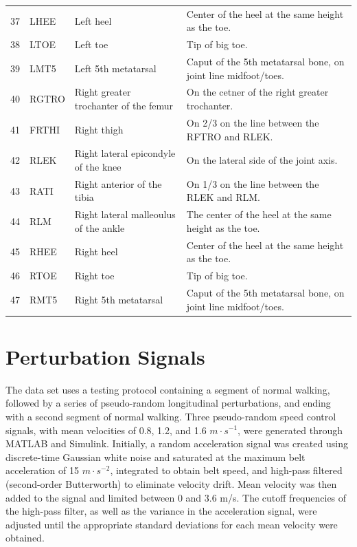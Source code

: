 \documentclass[10pt,a4paper,twocolumn]{article}
\begin{document}
\begin{table}
\begin{tabular}{rlll}
    37 & LHEE  & Left heel                             & Center of the heel at the same height as the toe. \\
    38 & LTOE  & Left toe                              & Tip of big toe. \\
    39 & LMT5  & Left 5th metatarsal                   & Caput of the 5th metatarsal bone, on joint line midfoot/toes. \\
    40 & RGTRO & Right greater trochanter of the femur & On the cetner of the right greater trochanter. \\
    41 & FRTHI & Right thigh                           & On 2/3 on the line between the RFTRO and RLEK. \\
    42 & RLEK  & Right lateral epicondyle of the knee  & On the lateral side of the joint axis. \\
    43 & RATI  & Right anterior of the tibia           & On 1/3 on the line between the RLEK and RLM. \\
    44 & RLM   & Right lateral malleoulus of the ankle & The center of the heel at the same height as the toe. \\
    45 & RHEE  & Right heel                            & Center of the heel at the same height as the toe. \\
    46 & RTOE  & Right toe                             & Tip of big toe. \\
    47 & RMT5  & Right 5th metatarsal                  & Caput of the 5th metatarsal bone, on joint line midfoot/toes. \\
    \bottomrule
  \end{tabular}
  \label{tab:marker-labels}
\end{table}

\section*{Perturbation Signals}
%
The data set uses a testing protocol containing a segment of normal walking,
followed by a series of pseudo-random longitudinal perturbations, and ending
with a second segment of normal walking. Three pseudo-random speed control
signals, with mean velocities of 0.8, 1.2, and 1.6 $m \cdot s^{-1}$, were
generated through MATLAB and Simulink. Initially, a  random acceleration signal
was created using discrete-time Gaussian white noise and saturated at the maximum
belt acceleration of 15 $m \cdot s^{-2}$, integrated to obtain belt speed, and 
high-pass filtered (second-order Butterworth) to eliminate velocity drift. Mean 
velocity was then added to the signal and limited between 0 and 3.6 m/s. The 
cutoff frequencies of the high-pass filter, as well as the variance in the acceleration 
signal, were adjusted until the appropriate standard deviations for each mean 
velocity were obtained.
\end{document}
